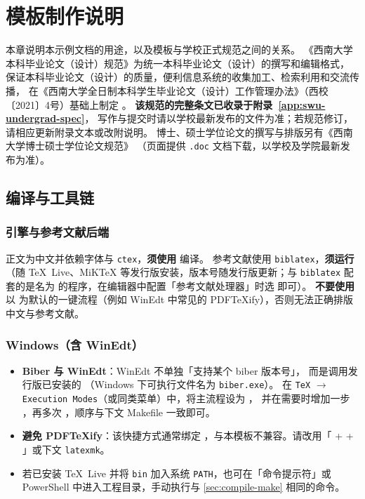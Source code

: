 \mainmatter
\chapter{模板制作说明}\label{ch:guide}

本章说明本示例文档的用途，以及模板与学校正式规范之间的关系。%
《西南大学本科毕业论文（设计）规范》为统一本科毕业论文（设计）的撰写和编辑格式，%
保证本科毕业论文（设计）的质量，便利信息系统的收集加工、检索利用和交流传播，%
在《西南大学全日制本科学生毕业论文（设计）工作管理办法》（西校〔2021〕4号）基础上制定%
\cite{swu2021thesisManageNotice,swuUndergradThesisSpecWeb}。%
\textbf{该规范的完整条文已收录于附录~\ref{app:swu-undergrad-spec}}，%
写作与提交时请以学校最新发布的文件为准；若规范修订，请相应更新附录文本或改附说明。%
博士、硕士学位论文的撰写与排版另有《西南大学博士硕士学位论文规范》%
\cite{swu2022gradThesisSpecDoc}（页面提供 \texttt{.doc} 文档下载，以学校及学院最新发布为准）。

\section{编译与工具链}\label{sec:compile}
\subsection{引擎与参考文献后端}
\begingroup\sloppy
正文为中文并依赖字体与 \texttt{ctex}，\textbf{须使用 } 编译。
参考文献使用 \texttt{biblatex}，\textbf{须运行 }（随 TeX~Live、MiKTeX 等发行版安装，版本号随发行版更新；与 \texttt{biblatex} 配套的是名为  的程序，在编辑器中配置「参考文献处理器」时选  即可）。
\textbf{不要使用}以  为默认的一键流程（例如 WinEdt 中常见的 PDF\TeX{}ify），否则无法正确排版中文与参考文献。
\par\endgroup

\subsection{Windows（含 WinEdt）}
\begin{itemize}
  \item \textbf{Biber 与 WinEdt}：WinEdt 不单独「支持某个 biber 版本号」，%
  而是调用发行版已安装的 （Windows 下可执行文件名为 \texttt{biber.exe}）。%
  在 \texttt{TeX} $\rightarrow$ \texttt{Execution Modes}（或同类菜单）中，将主流程设为 \textbf{}，%
  并在需要时增加一步 ，再多次 ，顺序与下文 Makefile 一致即可。
  \item \textbf{避免 PDF\TeX{}ify}：该快捷方式通常绑定 ，与本模板不兼容。请改用「 +  + 」或下文 \texttt{latexmk}。
  \item 若已安装 TeX~Live 并将 \texttt{bin} 加入系统 \texttt{PATH}，也可在「命令提示符」或 PowerShell 中进入工程目录，手动执行与 \cref{sec:compile-make} 相同的命令。
\end{itemize}


